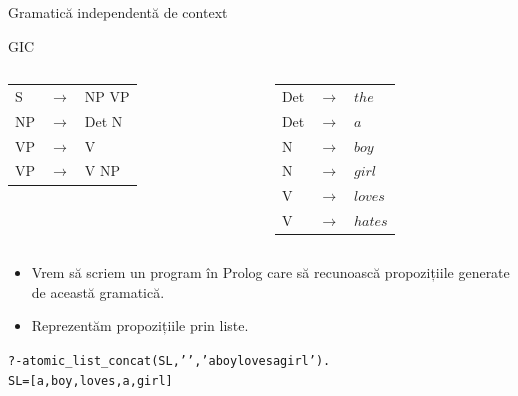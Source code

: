 \documentclass[xcolor=x11names,compress,10pt]{beamer}
\begin{document}
\begin{frame}{Gramatică  independentă de context}
\begin{block}{GIC}
\begin{columns}
\begin{column}{0.45\textwidth}
\begin{tabular}{lcl}
S &$\to$ & NP VP \\
NP &$\to$ &Det N \\
VP &$\to$ & V\\
VP &$\to$ & V NP\\

\end{tabular}
\end{column}
\begin{column}{0.45\textwidth}
\begin{tabular}{lcl}
Det &$\to$ & $the$\\
Det &$\to$ & $a$\\
N &$\to$ & $boy$\\
N &$\to$ & $girl$\\
V &$\to$ & $loves$\\
V &$\to$ &  $hates$
\end{tabular}
\end{column}
\end{columns}
\end{block}


\begin{itemize}
\item Vrem să scriem un program în Prolog care să recunoască propozițiile generate de această 
gramatică.
\item  Reprezentăm propozițiile prin  liste.
\end{itemize}
\begin{alltt}
?- atomic\_list\_concat(SL,' ' , 'a boy loves a girl').\\
SL = [a, boy, loves, a, girl]
\end{alltt}
\end{frame}

\end{document}
